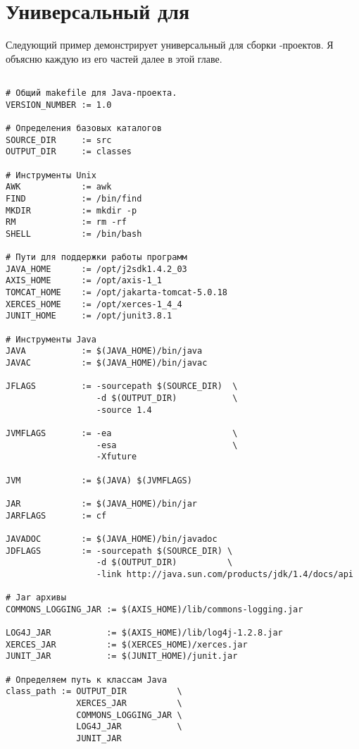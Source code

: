 \section{Универсальный \Makefile{} для \Java{}}

Следующий пример демонстрирует универсальный \Makefile{} для сборки
\Java{}\hyp{}проектов. Я объясню каждую из его частей далее в этой
главе.

{\footnotesize
\begin{verbatim}

# Общий makefile для Java-проекта.
VERSION_NUMBER := 1.0

# Определения базовых каталогов
SOURCE_DIR     := src
OUTPUT_DIR     := classes

# Инструменты Unix
AWK            := awk
FIND           := /bin/find
MKDIR          := mkdir -p
RM             := rm -rf
SHELL          := /bin/bash

# Пути для поддержки работы программ
JAVA_HOME      := /opt/j2sdk1.4.2_03
AXIS_HOME      := /opt/axis-1_1
TOMCAT_HOME    := /opt/jakarta-tomcat-5.0.18
XERCES_HOME    := /opt/xerces-1_4_4
JUNIT_HOME     := /opt/junit3.8.1

# Инструменты Java
JAVA           := $(JAVA_HOME)/bin/java
JAVAC          := $(JAVA_HOME)/bin/javac

JFLAGS         := -sourcepath $(SOURCE_DIR)  \
                  -d $(OUTPUT_DIR)           \
                  -source 1.4

JVMFLAGS       := -ea                        \
                  -esa                       \
                  -Xfuture

JVM            := $(JAVA) $(JVMFLAGS)

JAR            := $(JAVA_HOME)/bin/jar
JARFLAGS       := cf

JAVADOC        := $(JAVA_HOME)/bin/javadoc
JDFLAGS        := -sourcepath $(SOURCE_DIR) \
                  -d $(OUTPUT_DIR)          \
                  -link http://java.sun.com/products/jdk/1.4/docs/api

# Jar архивы
COMMONS_LOGGING_JAR := $(AXIS_HOME)/lib/commons-logging.jar

LOG4J_JAR           := $(AXIS_HOME)/lib/log4j-1.2.8.jar
XERCES_JAR          := $(XERCES_HOME)/xerces.jar
JUNIT_JAR           := $(JUNIT_HOME)/junit.jar

# Определяем путь к классам Java
class_path := OUTPUT_DIR          \
              XERCES_JAR          \
              COMMONS_LOGGING_JAR \
              LOG4J_JAR           \
              JUNIT_JAR


\end{verbatim}}
